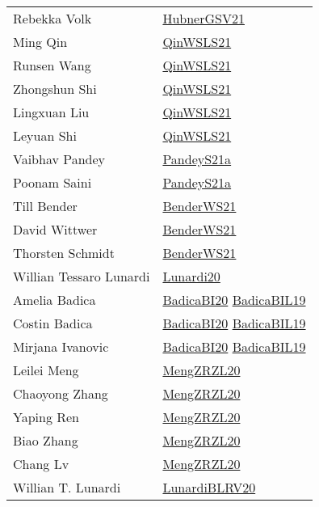 {\begin{longtable}{p{4cm}p{15cm}}
Rebekka Volk & \href{articles/HubnerGSV21.pdf}{HubnerGSV21}\cite{HubnerGSV21} \\
Ming Qin & \href{articles/QinWSLS21.pdf}{QinWSLS21}\cite{QinWSLS21} \\
Runsen Wang & \href{articles/QinWSLS21.pdf}{QinWSLS21}\cite{QinWSLS21} \\
Zhongshun Shi & \href{articles/QinWSLS21.pdf}{QinWSLS21}\cite{QinWSLS21} \\
Lingxuan Liu & \href{articles/QinWSLS21.pdf}{QinWSLS21}\cite{QinWSLS21} \\
Leyuan Shi & \href{articles/QinWSLS21.pdf}{QinWSLS21}\cite{QinWSLS21} \\
Vaibhav Pandey & \href{articles/PandeyS21a.pdf}{PandeyS21a}\cite{PandeyS21a} \\
Poonam Saini & \href{articles/PandeyS21a.pdf}{PandeyS21a}\cite{PandeyS21a} \\
Till Bender & \href{papers/BenderWS21.pdf}{BenderWS21}\cite{BenderWS21} \\
David Wittwer & \href{papers/BenderWS21.pdf}{BenderWS21}\cite{BenderWS21} \\
Thorsten Schmidt & \href{papers/BenderWS21.pdf}{BenderWS21}\cite{BenderWS21} \\
Willian Tessaro Lunardi & \href{}{Lunardi20}\cite{Lunardi20} \\
Amelia Badica & \href{articles/BadicaBI20.pdf}{BadicaBI20}\cite{BadicaBI20} \href{papers/BadicaBIL19.pdf}{BadicaBIL19}\cite{BadicaBIL19} \\
Costin Badica & \href{articles/BadicaBI20.pdf}{BadicaBI20}\cite{BadicaBI20} \href{papers/BadicaBIL19.pdf}{BadicaBIL19}\cite{BadicaBIL19} \\
Mirjana Ivanovic & \href{articles/BadicaBI20.pdf}{BadicaBI20}\cite{BadicaBI20} \href{papers/BadicaBIL19.pdf}{BadicaBIL19}\cite{BadicaBIL19} \\
Leilei Meng & \href{articles/MengZRZL20.pdf}{MengZRZL20}\cite{MengZRZL20} \\
Chaoyong Zhang & \href{articles/MengZRZL20.pdf}{MengZRZL20}\cite{MengZRZL20} \\
Yaping Ren & \href{articles/MengZRZL20.pdf}{MengZRZL20}\cite{MengZRZL20} \\
Biao Zhang & \href{articles/MengZRZL20.pdf}{MengZRZL20}\cite{MengZRZL20} \\
Chang Lv & \href{articles/MengZRZL20.pdf}{MengZRZL20}\cite{MengZRZL20} \\
Willian T. Lunardi & \href{articles/LunardiBLRV20.pdf}{LunardiBLRV20}\cite{LunardiBLRV20} \\

\end{longtable}}
